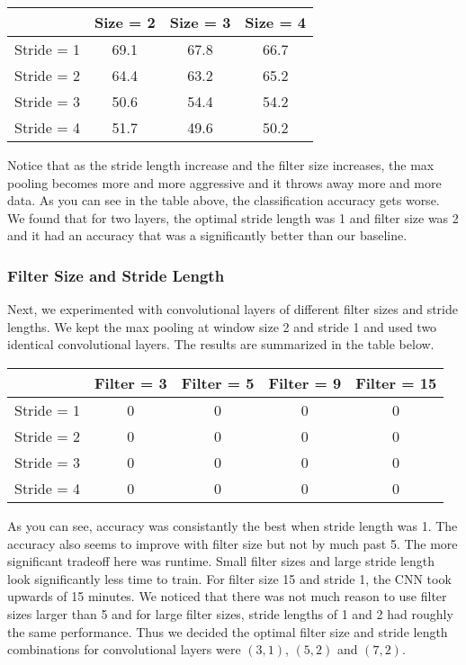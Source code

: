 \documentclass[10pt,twoside]{article}
\begin{document}
\begin{center}
 \begin{tabular}{||c c c c||} 
 \hline
  & Size = 2 & Size = 3 & Size = 4 \\ [0.5ex] 
 \hline\hline
 Stride = 1 & 69.1 & 67.8 & 66.7 \\ 
 \hline
 Stride = 2 & 64.4 & 63.2 & 65.2 \\
 \hline
 Stride = 3 & 50.6 & 54.4 & 54.2 \\
 \hline
 Stride = 4 & 51.7 & 49.6 & 50.2 \\
 \hline
\end{tabular}
\end{center}

Notice that as the stride length increase and the filter size increases, the max pooling becomes more and more aggressive and it throws away more and more data. As you can see in the table above, the classification accuracy gets worse. We found that for two layers, the optimal stride length was 1 and filter size was 2 and it had an accuracy that was a significantly better than our baseline.

\subsubsection{Filter Size and Stride Length}

 Next, we experimented with convolutional layers of different filter sizes and stride lengths. We kept the max pooling at window size 2 and stride 1 and used two identical convolutional layers. The results are summarized in the table below.

\begin{center}
 \begin{tabular}{||c c c c c||} 
 \hline
  & Filter = 3 & Filter = 5 & Filter = 9 & Filter = 15 \\ [0.5ex] 
 \hline\hline
 Stride = 1 & 0 & 0 & 0 & 0 \\ 
 \hline
 Stride = 2 & 0 & 0 & 0 & 0 \\
 \hline
 Stride = 3 & 0 & 0 & 0 & 0 \\
 \hline
 Stride = 4 & 0 & 0 & 0 & 0 \\
 \hline
\end{tabular}
\end{center}

 As you can see, accuracy was consistantly the best when stride length was 1. The accuracy also seems to improve with filter size but not by much past 5. The more significant tradeoff here was runtime. Small filter sizes and large stride length look significantly less time to train. For filter size 15 and stride 1, the CNN took upwards of 15 minutes. We noticed that there was not much reason to use filter sizes larger than 5 and for large filter sizes, stride lengths of 1 and 2 had roughly the same performance. Thus we decided the optimal filter size and stride length combinations for convolutional layers were $(3,1)$, $(5,2)$ and $(7,2)$.
\end{document}
